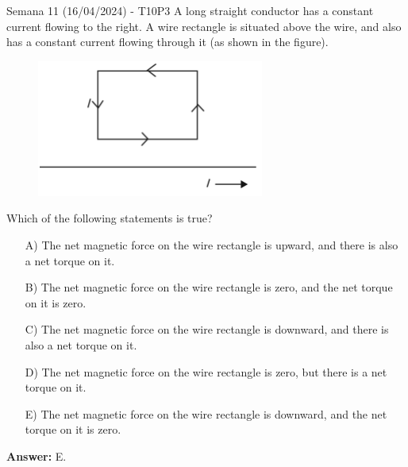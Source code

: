 \begin{frame}{Semana 11 (16/04/2024) - T10P3}
    \footnotesize
    A long straight conductor has a constant current flowing to the right. A wire rectangle is situated above the wire, and also has a constant current flowing through it (as shown in the figure).
    
    \begin{figure}
        \centering
        \includegraphics[scale=0.4]{figures/t10p3.png}
    \end{figure}
    Which of the following statements is true?
    
    
    \begin{itemize}
        \item[A)] The net magnetic force on the wire rectangle is upward, and there is also a net torque on it.
        \item[B)] The net magnetic force on the wire rectangle is zero, and the net torque on it is zero.
        \item[C)] The net magnetic force on the wire rectangle is downward, and there is also a net torque on it.
        \item[D)] The net magnetic force on the wire rectangle is zero, but there is a net torque on it.
        \item[E)] The net magnetic force on the wire rectangle is downward, and the net torque on it is zero.
    \end{itemize}
    
     \pause \centering \textbf{Answer:} E.
    
\end{frame}


